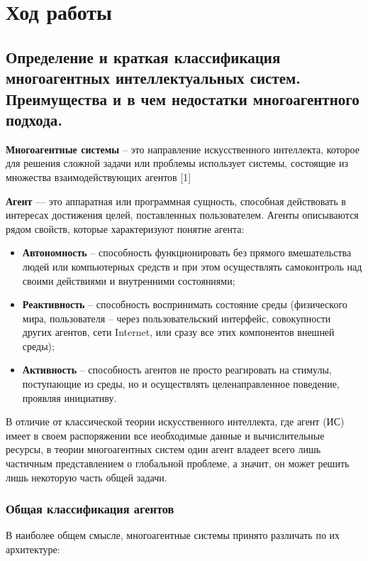 \documentclass[14pt,a4paper,report]{report}
\begin{document}
\clearpage

\section{Ход работы}

\subsection{Определение и краткая классификация многоагентных интеллектуальных систем. Преимущества и в чем недостатки многоагентного подхода.}

\textbf{Многоагентные системы} – это направление искусственного интеллекта, которое для решения сложной задачи или проблемы использует системы, состоящие из множества взаимодействующих агентов [1]

\textbf{Агент} — это аппаратная или программная сущность, способная действовать в интересах достижения целей, поставленных пользователем. Агенты описываются рядом свойств, которые характеризуют понятие агента:

\begin{itemize}
	\item \textbf{Автономность} -- способность функционировать без прямого вмешательства людей или компьютерных средств и при этом осуществлять самоконтроль над своими действиями и внутренними состояниями;
	\item \textbf{Реактивность} -- способность  воспринимать состояние среды  (физического мира, пользователя – через пользовательский  интерфейс, совокупности других агентов, сети Internet, или сразу все этих компонентов внешней среды);
	\item \textbf{Активность} -- способность агентов не просто реагировать на стимулы, поступающие из среды, но и осуществлять целенаправленное поведение, проявляя инициативу.
\end{itemize}

В отличие от классической теории искусственного интеллекта, где агент (ИС) имеет в своем распоряжении все необходимые данные и вычислительные ресурсы, в теории многоагентных систем один агент владеет всего лишь частичным представлением о глобальной проблеме, а значит, он может решить лишь некоторую часть общей задачи.

\subsubsection{Общая классификация агентов}

В наиболее общем смысле, многоагентные системы принято различать по их архитектуре:
\end{document}
